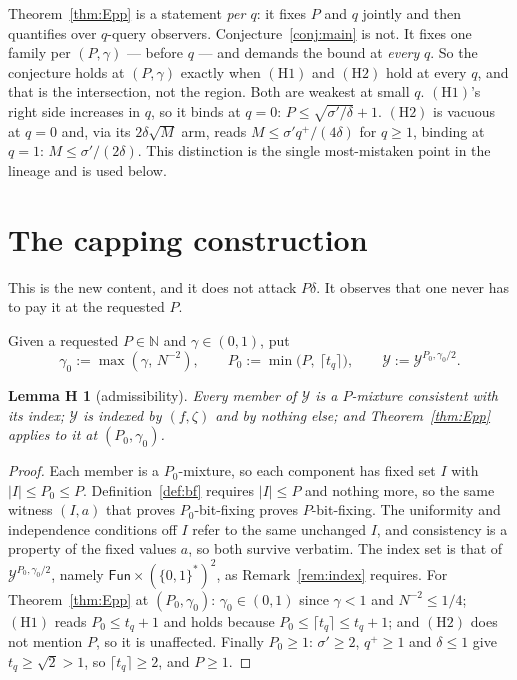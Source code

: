 \documentclass{aicr-solution}
\newcommand{\Fun}{\mathsf{Fun}}
\newcommand{\bits}{\{0,1\}}
\newtheorem*{lemHz}{Lemma H\textlf{0}}
\begin{document}
\begin{remark}\label{rem:A2}
Theorem~\ref{thm:Epp} is a statement \emph{per $q$}: it fixes $P$ and $q$ jointly
and then quantifies over $q$-query observers. Conjecture~\ref{conj:main} is not. It
fixes one family per $(P,\gamma)$ --- before $q$ --- and demands the bound at
\emph{every} $q$. So the conjecture holds at $(P,\gamma)$ exactly when
$(\mathrm{H1})$ and $(\mathrm{H2})$ hold at every $q$, and that is the
intersection, not the region. Both are weakest at small $q$. $(\mathrm{H1})$'s right
side increases in $q$, so it binds at $q = 0$: $P \le \sqrt{\sigma'/\delta} + 1$.
$(\mathrm{H2})$ is vacuous at $q = 0$ and, via its $2\delta\sqrt{M}$ arm, reads
$M \le \sigma' q^{+}/(4\delta)$ for $q \ge 1$, binding at $q = 1$:
$M \le \sigma'/(2\delta)$. This distinction is the single most-mistaken point in
the lineage and is used below.
\end{remark}

\section{The capping construction}\label{sec:capping}

This is the new content, and it does not attack $P\delta$. It observes that one
never has to pay it at the requested $P$.

Given a requested $P \in \mathbb{N}$ and $\gamma \in (0,1)$, put
\[
  \gamma_0 := \max(\gamma,\, N^{-2}),
  \qquad
  P_0 := \min\bigl(P,\ \lceil t_q \rceil\bigr),
  \qquad
  \mathcal{Y} := \mathcal{Y}^{P_0, \gamma_0/2} .
\]

\begin{lemHz}[admissibility]
Every member of $\mathcal{Y}$ is a $P$-mixture consistent with its index;
$\mathcal{Y}$ is indexed by $(f,\zeta)$ and by nothing else; and
Theorem~\ref{thm:Epp} applies to it at $(P_0,\gamma_0)$.
\end{lemHz}

\begin{proof}
Each member is a $P_0$-mixture, so each component has fixed set $I$ with
$|I| \le P_0 \le P$. Definition~\ref{def:bf} requires $|I| \le P$ and nothing more,
so the same witness $(I,a)$ that proves $P_0$-bit-fixing proves $P$-bit-fixing. The
uniformity and independence conditions off $I$ refer to the same unchanged $I$, and
consistency is a property of the fixed values $a$, so both survive verbatim. The
index set is that of $\mathcal{Y}^{P_0,\gamma_0/2}$, namely
$\Fun \times (\bits^{*})^{2}$, as Remark~\ref{rem:index} requires. For
Theorem~\ref{thm:Epp} at $(P_0,\gamma_0)$: $\gamma_0 \in (0,1)$ since $\gamma < 1$
and $N^{-2} \le 1/4$; $(\mathrm{H1})$ reads $P_0 \le t_q + 1$ and holds because
$P_0 \le \lceil t_q \rceil \le t_q + 1$; and $(\mathrm{H2})$ does not mention $P$,
so it is unaffected. Finally $P_0 \ge 1$: $\sigma' \ge 2$, $q^{+} \ge 1$ and
$\delta \le 1$ give $t_q \ge \sqrt2 > 1$, so $\lceil t_q \rceil \ge 2$, and
$P \ge 1$.
\end{proof}
\end{document}
